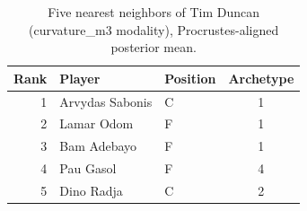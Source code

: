 \begin{table}[htbp]
  \centering\small
  \begin{tabular}{rllc}
    \toprule
    Rank & Player & Position & Archetype \\
    \midrule
    1 & Arvydas Sabonis & C & 1 \\
    2 & Lamar Odom & F & 1 \\
    3 & Bam Adebayo & F & 1 \\
    4 & Pau Gasol & F & 4 \\
    5 & Dino Radja & C & 2 \\
    \bottomrule
  \end{tabular}
  \caption{Five nearest neighbors of Tim Duncan (curvature_m3 modality), Procrustes-aligned posterior mean.}
  \label{tab:Tim_Duncan_neighbors_curvature_m3}
\end{table}

